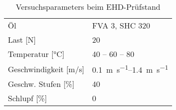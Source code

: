 \begin{table}[htbp]
    \centering
    \caption{Versuchsparameters beim EHD-Prüfstand}
    \begin{tabular}{ll}
        Öl                                                        & FVA 3, SHC 320                                                  \\
        Last [\si{N}]                                             & 20                                                     \\
        Temperatur [\si{\degreeCelsius}]                          & 40 – 60 – 80                                           \\
        Geschwindigkeit [\si[per-mode=symbol]{\meter\per\second}] & \SIrange[per-mode=symbol]{0.1}{1.4}{\meter\per\second} \\
        Geschw. Stufen [\si{\%}]                                  & 40                                                     \\
        Schlupf [\si{\%}]                                         & 0                                                      \\
    \end{tabular}
    \label{tab:ehd_test_params}
\end{table}
